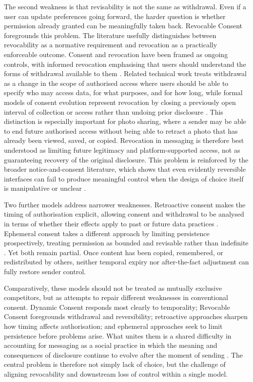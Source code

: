 The second weakness is that revisability is not the same as withdrawal. Even if a user can update preferences going forward, the harder question is whether permission already granted can be meaningfully taken back. Revocable Consent foregrounds this problem. The literature usefully distinguishes between revocability as a normative requirement and revocation as a practically enforceable outcome. Consent and revocation have been framed as ongoing controls, with informed revocation emphasising that users should understand the forms of withdrawal available to them \cite{agrafiotis_consent_revocation_2012}. Related technical work treats withdrawal as a change in the scope of authorised access where users should be able to specify who may access data, for what purposes, and for how long, while formal models of consent evolution represent revocation by closing a previously open interval of collection or access rather than undoing prior disclosure \cite{merlec_smart_2021,robol_consent_2023}. This distinction is especially important for photo sharing, where a sender may be able to end future authorised access without being able to retract a photo that has already been viewed, saved, or copied. Revocation in messaging is therefore best understood as limiting future legitimacy and platform-supported access, not as guaranteeing recovery of the original disclosure. This problem is reinforced by the broader notice-and-consent literature, which shows that even evidently reversible interfaces can fail to produce meaningful control when the design of choice itself is manipulative or unclear \cite{nouwens_dark_2020}.

Two further models address narrower weaknesses. Retroactive consent makes the timing of authorisation explicit, allowing consent and withdrawal to be analysed in terms of whether their effects apply to past or future data practices \cite{robol_consent_2023}. Ephemeral consent takes a different approach by limiting persistence prospectively, treating permission as bounded and revisable rather than indefinite
\cite{im_yes_2021}. Yet both remain partial. Once content has been copied, remembered, or redistributed by others, neither temporal expiry nor after-the-fact adjustment can fully restore sender control.

Comparatively, these models should not be treated as mutually exclusive competitors, but as attempts to repair different weaknesses in conventional consent. Dynamic Consent responds most clearly to temporality; Revocable Consent foregrounds withdrawal and reversibility; retroactive approaches sharpen how timing affects authorisation; and ephemeral approaches seek to limit persistence before problems arise. What unites them is a shared difficulty in accounting for messaging as a social practice in which the meaning and consequences of disclosure continue to evolve after the moment of sending \cite{kaye_dynamic_2015,robol_consent_2023,politou_2018,im_yes_2021}. The central problem is therefore not simply lack of choice, but the challenge of aligning  revocability and downstream loss of control within a single model.

